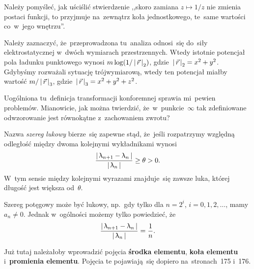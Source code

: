 \documentclass[a4paper,11pt]{article}
\begin{document}
\start {} Należy pomyśleć, jak uściślić stwierdzenie ,,skoro
zamiana $z \mapsto 1 / z$ nie zmienia postaci funkcji, to przyjmuje
na~zewnątrz koła jednostkowego, te~same wartości co~w~jego wnętrzu''.

\vspace{\spaceFour}


\start {} Należy zaznaczyć, że~przeprowadzona tu~analiza
odnosi~się do~siły elektrostatycznej w~dwóch wymiarach przestrzennych.
Wtedy istotnie potencjał pola ładunku punktowego wynosi
$m \log(1 / \left| \,  \vec{ r }  \, \right|_{ 2 } )$,
gdzie~$\left| \,  \vec{ r }  \, \right|_{ 2 } = x^{ 2 } + y^{ 2 }$. Gdybyśmy rozważali
sytuację trójwymiarową, wtedy ten potencjał miałby wartość
$m / \left| \,  \vec{ r }  \, \right|_{ 3 }$,
gdzie~$\left| \,  \vec{ r }  \, \right|_{ 3 } = x^{ 2 } + y^{ 2 } + z^{ 2 }$.

\vspace{\spaceFour}


\start {} Uogólniona tu~definicja transformacji konforemnej
sprawia mi~pewien problemów. Mianowicie, jak można twierdzić,
że~w~punkcie~$\infty$ tak zdefiniowane odwzorowanie jest równokątne
z~zachowaniem zwrotu?

\vspace{\spaceFour}


\start {} Nazwa \emph{szereg lukowy} bierze~się zapewne stąd,
że~jeśli rozpatrzymy względną odległość między dwoma kolejnymi
wykładnikami wynosi
\begin{equation}
  \label{eq:Leja-49}
  \frac{ \left| \,  \uplambda_{ n + 1 } - \uplambda_{ n }  \, \right| }{ \left| \,  \uplambda_{ n }  \, \right| }
  \geq \theta > 0.
\end{equation}
W~tym sensie między kolejnymi wyrazami znajduje~się zawsze luka,
której długość jest większa od~$\theta$.

Szereg potęgowy może być lukowy, np.~gdy tylko dla $n = 2^{ i }$,
$i = 0, 1, 2, \ldots$, mamy $a_{ n } \neq 0$. Jednak w~ogólności
możemy tylko powiedzieć, że
\begin{equation}
  \label{eq:Leja-50}
  \frac{ \left| \,  \uplambda_{ n + 1 } - \uplambda_{ n }  \, \right| }{ \left| \,  \uplambda_{ n }  \, \right| }
  = \frac{ 1 }{ n }.
\end{equation}

\vspace{\spaceFour}


\start {} Już tutaj należałoby wprowadzić pojęcia
\textbf{środka elementu}, \textbf{koła elementu} i~\textbf{promienia
  elementu}. Pojęcia te pojawiają~się dopiero na~stronach~175 i~176.

\vspace{\spaceFour}
\end{document}
